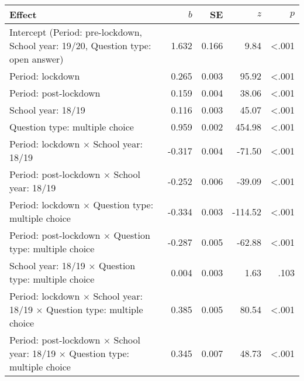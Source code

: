 
\begin{tabular}{lrrrr}
\toprule
Effect & $b$ & SE & $z$ & $p$\\
\midrule
Intercept \small{(Period: pre-lockdown, School year: 19/20, Question type: open answer)} & 1.632 & 0.166 & 9.84 & <.001\\
Period: lockdown & 0.265 & 0.003 & 95.92 & <.001\\
Period: post-lockdown & 0.159 & 0.004 & 38.06 & <.001\\
School year: 18/19 & 0.116 & 0.003 & 45.07 & <.001\\
Question type: multiple choice & 0.959 & 0.002 & 454.98 & <.001\\
\addlinespace
Period: lockdown $\times$ School year: 18/19 & -0.317 & 0.004 & -71.50 & <.001\\
Period: post-lockdown $\times$ School year: 18/19 & -0.252 & 0.006 & -39.09 & <.001\\
Period: lockdown $\times$ Question type: multiple choice & -0.334 & 0.003 & -114.52 & <.001\\
Period: post-lockdown $\times$ Question type: multiple choice & -0.287 & 0.005 & -62.88 & <.001\\
School year: 18/19 $\times$ Question type: multiple choice & 0.004 & 0.003 & 1.63 & .103\\
\addlinespace
Period: lockdown $\times$ School year: 18/19 $\times$ Question type: multiple choice & 0.385 & 0.005 & 80.54 & <.001\\
Period: post-lockdown $\times$ School year: 18/19 $\times$ Question type: multiple choice & 0.345 & 0.007 & 48.73 & <.001\\
\bottomrule
\end{tabular}